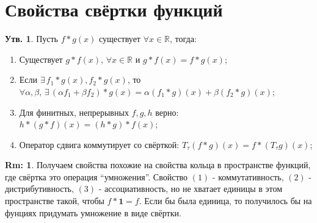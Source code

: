 \documentclass[12pt]{article}
\newcommand{\MR}{\mathbb{R}}
\theoremstyle{definition}
\newtheorem{rem}{Rm:}
\newtheorem{prop}{Утв.}
\begin{document}
\section*{Свойства свёртки функций}

\begin{prop}
	Пусть $f*g(x)$ существует $\forall x \in \MR$, тогда:
	\begin{enumerate}[label=(\arabic*)]
		\item Существует $g*f(x), \, \forall x \in \MR$ и $g*f(x) =f*g(x)$;
		\item Если $\exists \, f_1 *g(x), f_2*g(x)$, то $\forall \alpha, \beta, \, \exists \, (\alpha f_1 + \beta f_2)*g(x) = \alpha (f_1 *g)(x) + \beta(f_2*g)(x)$;
		\item Для финитных, непрерывных $f,g,h$ верно: $h*(g*f)(x) = (h*g)*f(x)$;
		\item Оператор сдвига коммутирует со свёрткой: $T_\tau(f*g) (x) = f*(T_\tau g)(x)$; 
	\end{enumerate}
\end{prop}
\begin{rem}
	Получаем свойства похожие на свойства кольца в пространстве функций, где свёртка это операция ``умножения''. Свойство $(1)$ - коммутативность, $(2)$ - дистрибутивность, $(3)$ - ассоциативность, но не хватает единицы в этом пространстве такой, чтобы $f*\mathbf{1} = f$. Если бы была единица, то получилось бы на фунциях придумать умножение в виде свёртки.
\end{rem}
\end{document}
